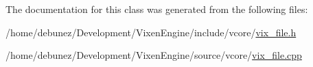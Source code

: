 The documentation for this class was generated from the following files\+:\begin{DoxyCompactItemize}
\item 
/home/debunez/\+Development/\+Vixen\+Engine/include/vcore/\hyperlink{vix__file_8h}{vix\+\_\+file.\+h}\item 
/home/debunez/\+Development/\+Vixen\+Engine/source/vcore/\hyperlink{vix__file_8cpp}{vix\+\_\+file.\+cpp}\end{DoxyCompactItemize}
